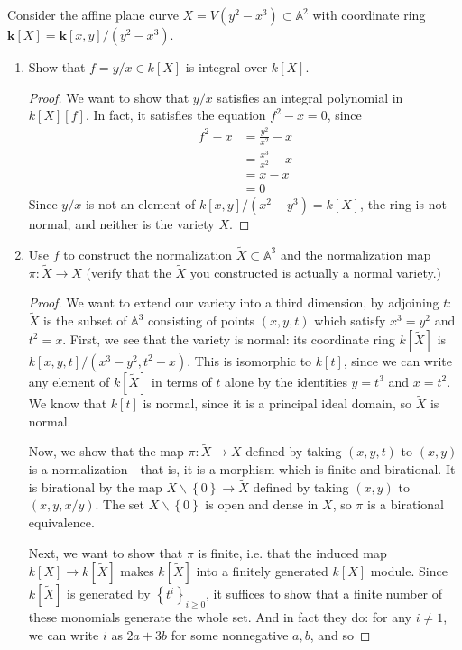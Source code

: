 \documentclass[12pt]{article}
\theoremstyle{definition}
\newenvironment{problem}[2][Problem]{\begin{trivlist}
\item[\hskip \labelsep {\bfseries #1}\hskip \labelsep {\bfseries #2.}]}{\end{trivlist}}
\begin{document}
\begin{problem}{5}
	Consider the affine plane curve $X = V(y^2 - x^3) \subset \mathbb A^2$ with coordinate ring $\mathbf k[X] = \mathbf k[x,y] / (y^2 - x^3)$. 
	\begin{enumerate}[label=(\alph*)]
		\item Show that $f = y/x \in k[X]$ is integral over $k[X]$.
			\begin{proof}
				We want to show that $y/x$ satisfies an integral polynomial in $k[X][f]$. In fact, it satisfies the equation $f^2 -x = 0$, since
				\begin{align*}
					f^2 - x &= \frac{y^2}{x^2} - x\\
					&= \frac{x^3}{x^2} - x\\
					&= x - x\\
					&= 0
				\end{align*}
				Since $y/x$ is not an element of $ k[x,y]/(x^2 - y^3) = k[X]$, the ring is not normal, and neither is the variety $X$. 
			\end{proof}
		\item Use $f$ to construct the normalization $\tilde X \subset \mathbb A^3$ and the normalization map $\pi: \tilde X \to X$ (verify that the $\tilde X$ you constructed is actually a normal variety.)
				\begin{proof}
					We want to extend our variety into a third dimension, by adjoining $t$: $\tilde X$ is the subset of $\mathbb A^3$ consisting of points $(x,y,t)$ which satisfy $x^3 = y^2$ and $t^2 = x$. 
					First, we see that the variety is normal: its coordinate ring $k[\tilde X]$ is $k[x,y,t]/(x^3 - y^2, t^2 - x)$. This is isomorphic to $k[t]$, since we can write any element of $k[\tilde X]$ in terms of $t$ alone by the identities $y = t^3$ and $x = t^2$. We know that $k[t]$ is normal, since it is a principal ideal domain, so $\tilde X$ is normal.
					\par Now, we show that the map $\pi: \tilde X \to X$ defined by taking $(x,y,t)$ to $(x,y)$ is a normalization - that is, it is a morphism which is finite and birational. It is birational by the map $X \backslash \left\{ 0 \right\} \to \tilde X$ defined by taking $(x,y)$ to $(x,y, x/y)$. The set $X \backslash \left\{ 0 \right\}$ is open and dense in $X$, so $\pi$ is a birational equivalence.
					\par Next, we want to show that $\pi$ is finite, i.e. that the induced map $k[X] \to k[\tilde X]$ makes $k[\tilde X]$ into a finitely generated $k[X]$ module. Since $k[\tilde X]$ is generated by $\left\{ t^i \right\}_{i \geq 0}$, it suffices to show that a finite number of these monomials generate the whole set. And in fact they do: for any $i \neq 1$, we can write $i$ as $2a + 3b$ for some nonnegative $a, b$, and so

\end{proof}
\end{enumerate}
\end{problem}
\end{document}
